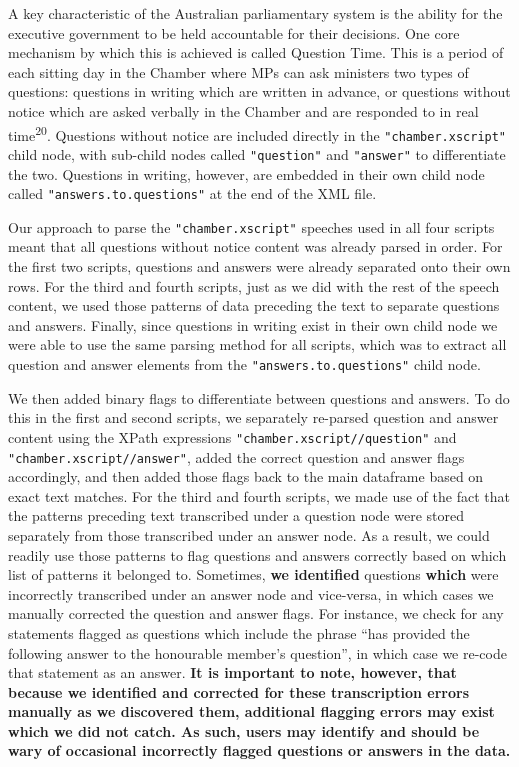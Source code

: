 \documentclass[
  letterpaper,
  DIV=11,
  numbers=noendperiod]{scrartcl}
\begin{document}
A key characteristic of the Australian parliamentary system is the
ability for the executive government to be held accountable for their
decisions. One core mechanism by which this is achieved is called
Question Time. This is a period of each sitting day in the Chamber where
MPs can ask ministers two types of questions: questions in writing which
are written in advance, or questions without notice which are asked
verbally in the Chamber and are responded to in real
time\textsuperscript{20}. Questions without notice are included directly
in the \texttt{"chamber.xscript"} child node, with sub-child nodes
called \texttt{"question"} and \texttt{"answer"} to differentiate the
two. Questions in writing, however, are embedded in their own child node
called \texttt{"answers.to.questions"} at the end of the XML file.

Our approach to parse the \texttt{"chamber.xscript"} speeches used in
all four scripts meant that all questions without notice content was
already parsed in order. For the first two scripts, questions and
answers were already separated onto their own rows. For the third and
fourth scripts, just as we did with the rest of the speech content, we
used those patterns of data preceding the text to separate questions and
answers. Finally, since questions in writing exist in their own child
node we were able to use the same parsing method for all scripts, which
was to extract all question and answer elements from the
\texttt{"answers.to.questions"} child node.

We then added binary flags to differentiate between questions and
answers. To do this in the first and second scripts, we separately
re-parsed question and answer content using the XPath expressions
\texttt{"chamber.xscript//question"} and
\texttt{"chamber.xscript//answer"}, added the correct question and
answer flags accordingly, and then added those flags back to the main
dataframe based on exact text matches. For the third and fourth scripts,
we made use of the fact that the patterns preceding text transcribed
under a question node were stored separately from those transcribed
under an answer node. As a result, we could readily use those patterns
to flag questions and answers correctly based on which list of patterns
it belonged to. Sometimes, \textbf{we identified} questions
\textbf{which} were incorrectly transcribed under an answer node and
vice-versa, in which cases we manually corrected the question and answer
flags. For instance, we check for any statements flagged as questions
which include the phrase ``has provided the following answer to the
honourable member's question'', in which case we re-code that statement
as an answer. \textbf{It is important to note, however, that because we
identified and corrected for these transcription errors manually as we
discovered them, additional flagging errors may exist which we did not
catch. As such, users may identify and should be wary of occasional
incorrectly flagged questions or answers in the data.}
\end{document}
